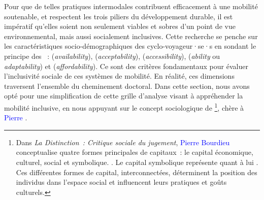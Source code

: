 \begin{refsegment}
Pour que de telles pratiques intermodales contribuent efficacement à une mobilité soutenable, et respectent les trois piliers du développement \gls{durable}, il est impératif qu’elles soient non seulement viables et sobres d’un point de vue environnemental, mais aussi socialement inclusives. Cette recherche se penche sur les caractéristiques socio-démographiques des cyclo-voyageur·se·s en sondant le principe des  \textcolor{blue}{\autocite[347]{shrestha_review_2017}}~:  (\textsl{availability}),  (\textsl{acceptability}),  (\textsl{accessibility}),  (\textsl{ability} ou \textsl{adaptability}) et  (\textsl{affordability}). Ce sont des critères fondamentaux pour évaluer l’inclusivité sociale de ces systèmes de mobilité. En réalité, ces dimensions traversent l'ensemble du cheminement doctoral. Dans cette section, nous avons opté pour une simplification de cette grille d'analyse visant à appréhender la mobilité inclusive, en nous appuyant sur le concept sociologique de \footnote{
    Dans \textsl{La Distinction~: Critique sociale du jugement}, \textcolor{blue}{Pierre Bourdieu} conceptualise quatre formes principales de capitaux~: le capital économique, culturel, social et symbolique.  \textcolor{blue}{\autocite[2]{bourdieu_distinction_1979}}. Le capital symbolique représente quant à lui  \textcolor{blue}{\autocite[178]{bourdieu_sens_1980}}. Ces différentes formes de capital, interconnectées, déterminent la position des individus dans l'espace social et influencent leurs pratiques et goûts culturels.
}, chère à \textcolor{blue}{Pierre} \textcolor{blue}{\textcite[2]{bourdieu_distinction_1979}}.


\end{refsegment}

